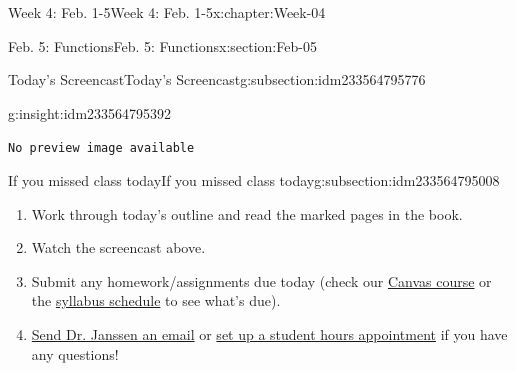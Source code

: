 \documentclass[oneside,10pt,]{book}
\newcommand{\mono}[1]{\texttt{#1}}
\numberwithin{equation}{section}
\newlength{\previewwidth}
\begin{document}
\begin{chapterptx}{Week 4: Feb. 1-5}{}{Week 4: Feb. 1-5}{}{}{x:chapter:Week-04}
\begin{sectionptx}{Feb. 5: Functions}{}{Feb. 5: Functions}{}{}{x:section:Feb-05}
\begin{subsectionptx}{Today's Screencast}{}{Today's Screencast}{}{}{g:subsection:idm233564795776}
\begin{insight}{}{g:insight:idm233564795392}
\begin{tcbraster}[raster columns=2, raster column skip=1pt, raster halign=center, raster force size=false, raster left skip=0pt, raster right skip=0pt]
\begin{tcolorbox}[previewstyle, width=\previewwidth]
\mono{No preview image available}%
\end{tcolorbox}%
\begin{tcolorbox}[qrstyle]%
[QR LINK]\end{tcolorbox}%
\end{tcbraster}%
\end{insight}
\end{subsectionptx}
%
%
\typeout{************************************************}
\typeout{************************************************}
%
\begin{subsectionptx}{If you missed class today}{}{If you missed class today}{}{}{g:subsection:idm233564795008}
%
\begin{enumerate}
\item{}Work through today's outline and read the marked pages in the book.%
\item{}Watch the screencast above.%
\item{}Submit any homework\slash{}assignments due today (check our \href{https://dordt.instructure.com/courses/3110050}{Canvas course} or the \href{https://prof.mkjanssen.org/ds/index.html\#schedule}{syllabus schedule} to see what's due).%
\item{}\href{mailto:mike.janssen@dordt.edu}{Send Dr. Janssen an email} or \href{https://calendly.com/mkjanssen/student-hours}{set up a student hours appointment} if you have any questions!%
\end{enumerate}
\end{subsectionptx}
\end{sectionptx}
\end{chapterptx}
%
%
\typeout{************************************************}
\typeout{************************************************}
%
\end{document}
